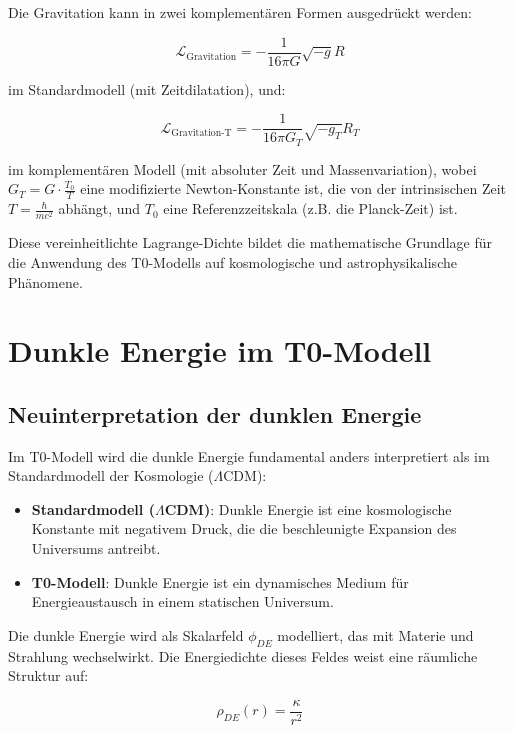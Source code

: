 \documentclass[a4paper,12pt]{article}
\begin{document}
	Die Gravitation kann in zwei komplementären Formen ausgedrückt werden:
	
	\begin{equation}
		\mathcal{L}_\text{Gravitation} = -\frac{1}{16\pi G} \sqrt{-g} R
	\end{equation}
	
	im Standardmodell (mit Zeitdilatation), und:
	
	\begin{equation}
		\mathcal{L}_\text{Gravitation-T} = -\frac{1}{16\pi G_T} \sqrt{-g_T} R_T
	\end{equation}
	
	im komplementären Modell (mit absoluter Zeit und Massenvariation), wobei $G_T = G \cdot \frac{T_0}{T}$ eine modifizierte Newton-Konstante ist, die von der intrinsischen Zeit $T = \frac{\hbar}{mc^2}$ abhängt, und $T_0$ eine Referenzzeitskala (z.B. die Planck-Zeit) ist.
	
	Diese vereinheitlichte Lagrange-Dichte bildet die mathematische Grundlage für die Anwendung des T0-Modells auf kosmologische und astrophysikalische Phänomene.
	
	\section{Dunkle Energie im T0-Modell}
	
	\subsection{Neuinterpretation der dunklen Energie}
	
	Im T0-Modell wird die dunkle Energie fundamental anders interpretiert als im Standardmodell der Kosmologie ($\Lambda$CDM):
	
	\begin{itemize}
		\item \textbf{Standardmodell ($\Lambda$CDM)}: Dunkle Energie ist eine kosmologische Konstante mit negativem Druck, die die beschleunigte Expansion des Universums antreibt.
		\item \textbf{T0-Modell}: Dunkle Energie ist ein dynamisches Medium für Energieaustausch in einem statischen Universum.
	\end{itemize}
	
	Die dunkle Energie wird als Skalarfeld $\phi_{DE}$ modelliert, das mit Materie und Strahlung wechselwirkt. Die Energiedichte dieses Feldes weist eine räumliche Struktur auf:
	
	\begin{equation}
		\rho_{DE}(r) = \frac{\kappa}{r^2}
	\end{equation}
	
\end{document}
